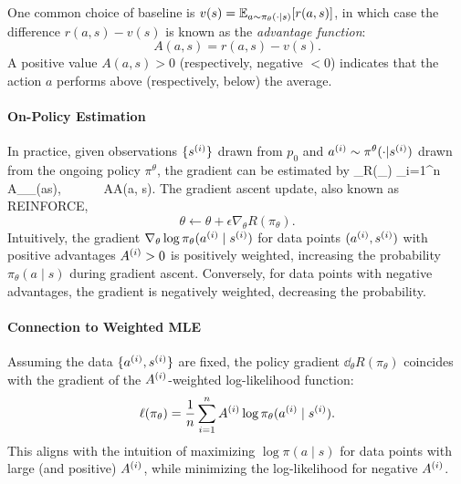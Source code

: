 \documentclass[letterpaper,11pt]{article}
\begin{document}
One common choice of baseline is $v(s) = \mathbb{E}_{a\sim \pi_\theta(\cdot|s)}[r(a,s)]$, in which case the difference $r(a,s) - v(s)$ is known as the \emph{advantage function}:
$$
A(a, s) = r(a,s) - v(s).
$$
A positive value $A(a,s) > 0$ (respectively, negative $<0$) indicates that the action $a$ performs above (respectively, below) the average. 



\paragraph{On-Policy Estimation} 
In practice, given observations $\{s^{(i)}\}$ drawn from $p_0$ and $a^{(i)} \sim \pi^\theta(\cdot|s^{(i)})$ drawn from the ongoing policy $\pi^\theta$, 
the gradient can be estimated by 
\bbb \label{equ:onpolicyestimate}
\nabla_\theta  R(\pi_\theta ) 
 \approx {}\sum_{i=1}^n  
A\datai \nabla_\theta  \log  \pi_\theta (a\datai \mid s\datai),~~~~~~ 
 A\datai {}  A(a\datai, s\datai). 
\eee  
The gradient ascent update, also known as REINFORCE, 
$$
\theta\gets \theta + \epsilon \nabla_\theta  R(\pi_\theta ).  
$$
Intuitively, the gradient $\nabla_\theta \log \pi_\theta (a^{(i)} \mid s^{(i)})$ for data points $(a^{(i)}, s^{(i)})$ with positive advantages $A^{(i)} > 0$ is positively weighted, increasing the probability $\pi_\theta(a \mid s)$ during gradient ascent. Conversely, for data points with negative advantages, the gradient is negatively weighted, decreasing the probability.  


\paragraph{Connection to Weighted MLE}  
Assuming the data $\{a^{(i)}, s^{(i)}\}$ are fixed, the policy gradient $\dd_\theta R(\pi_\theta)$ coincides with the gradient of the $A^{(i)}$-weighted log-likelihood function:  
$$
\ell(\pi_\theta) = \frac{1}{n} \sum_{i=1}^n A^{(i)} \log \pi_\theta(a^{(i)} \mid s^{(i)}).
$$  
This aligns with the intuition of maximizing $\log \pi(a \mid s)$ for data points with large (and positive) $A^{(i)}$, while minimizing the log-likelihood for negative $A^{(i)}$.  
\end{document}
